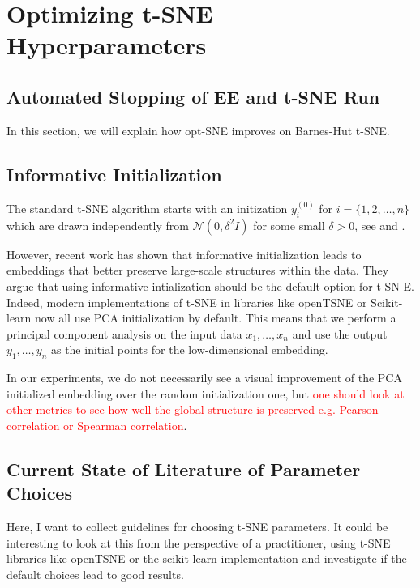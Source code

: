 \section{Optimizing t-SNE Hyperparameters}

\subsection{Automated Stopping of EE and t-SNE Run}
In this section, we will explain how opt-SNE \cite{belkina19} improves on Barnes-Hut t-SNE. 

\subsection{Informative Initialization}
The standard t-SNE algorithm starts with an initization $y_i^{(0)}$ for $i=\{1, 2, \dots, n\}$ which are drawn independently from $\mathcal{N}(0, \delta^2 I)$ for some small $\delta > 0$, see \cite{vdMaa08} and \cite{vdMaa14}. 

However, recent work \cite{kobak21} has shown that informative initialization leads to embeddings that better preserve large-scale structures within the data. 
They argue that using informative intialization should be the default option for t-SN
E.
Indeed, modern implementations of t-SNE in libraries like openTSNE \cite{openTSNE} or Scikit-learn now all use PCA initialization by default. 
This means that we perform a principal component analysis on the input data $x_1, \dots, x_n$ and use the output $y_1, \dots, y_n$ as the initial points for the low-dimensional embedding. 

In our experiments, we do not necessarily see a visual improvement of the PCA initialized embedding over the random initialization one, but \textcolor{red}{one should look at other metrics to see how well the global structure is preserved e.g. Pearson correlation or Spearman correlation}. 

\subsection{Current State of Literature of Parameter Choices}
Here, I want to collect guidelines for choosing t-SNE parameters. It could be interesting to look at this from the perspective of a practitioner, using t-SNE libraries like openTSNE or the scikit-learn implementation and investigate if the default choices lead to good results. 

